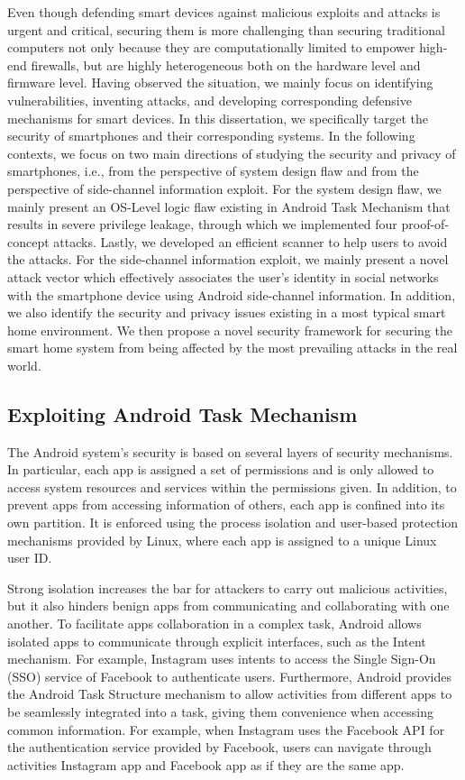 \documentclass[letterpaper,12pt]{article}
\begin{document}
Even though defending smart devices against malicious exploits and attacks is urgent and critical, securing them is more challenging than securing traditional computers not only because they are computationally limited to empower high-end firewalls, but are highly heterogeneous both on the hardware level and firmware level. Having observed the situation,  we mainly focus on identifying vulnerabilities, inventing attacks, and developing corresponding defensive mechanisms for smart devices. In this dissertation, we specifically target the security of smartphones and their corresponding systems. In the following contexts, we focus on two main directions of studying the security and privacy of smartphones, i.e., from the perspective of system design flaw and from the perspective of side-channel information exploit. For the system design flaw, we mainly present an OS-Level logic flaw existing in Android Task Mechanism that results in severe privilege leakage, through which we implemented four proof-of-concept attacks. Lastly, we developed an efficient scanner to help users to avoid the attacks. For the side-channel information exploit, we mainly present a novel attack vector which effectively associates the user's identity in social networks with the smartphone device using Android side-channel information. In addition, we also identify the security and privacy issues existing in a most typical smart home environment. We then propose a novel security framework for securing the smart home system from being affected by the most prevailing attacks in the real world.

\subsection{Exploiting Android Task Mechanism}
The Android system's security is based on several layers of security
mechanisms. In particular, each app is assigned a set of permissions and is only allowed to access system resources and services within the
permissions given. In addition, to prevent apps from accessing
information of others, each app is confined into its own partition.
It is enforced using the process isolation and user-based protection
mechanisms provided by Linux, where each app is assigned to a unique
Linux user ID.

Strong isolation increases the bar for attackers to carry out
malicious activities, but it also hinders benign apps from
communicating and collaborating with one another. To facilitate apps
collaboration in a complex task, Android allows isolated apps to
communicate through explicit interfaces, such as the Intent
mechanism. For example, Instagram uses intents to access the Single
Sign-On (SSO) service of Facebook to authenticate users.  Furthermore,
Android provides the Android Task Structure mechanism to allow activities
from different apps to be seamlessly integrated into a task, giving
them convenience when accessing common information. For example,
when Instagram uses the Facebook API for the authentication service
provided by Facebook, users can navigate through activities Instagram
app and Facebook app as if they are the same app.
\end{document}
